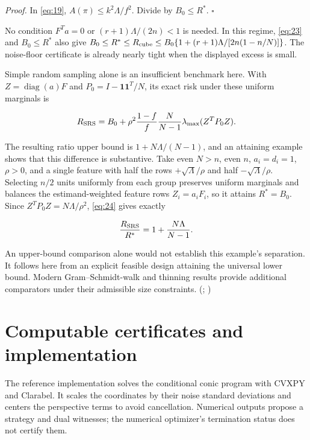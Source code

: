 \documentclass[11pt]{article}
\begin{document}
\emph{Proof.} In \eqref{eq:19}, \(A(\pi)\le k^2\Lambda/f^2\). Divide by
\(B_0\le R^*\). \(\square\)

No condition \(F^Ta=0\) or \((r+1)\Lambda/(2n)<1\) is needed. In this
regime, \eqref{eq:23} and \(B_0\le R^*\) also give
\(B_0\le R^*\le R_{\rm cube}\le B_0\{1+(r+1)\Lambda/[2n(1-n/N)]\}\). The
noise-floor certificate is already nearly tight when the displayed
excess is small.

Simple random sampling alone is an insufficient benchmark here. With
\(Z=\operatorname{diag}(a)F\) and \(P_0=I-\mathbf1\mathbf1^T/N\), its
exact risk under these uniform marginals is

\begin{equation}\label{eq:24}
R_{\rm SRS}=B_0+
\rho^2\frac{1-f}{f}\frac{N}{N-1}
\lambda_{\max}(Z^TP_0Z). 
\end{equation}

The resulting ratio upper bound is \(1+N\Lambda/(N-1)\), and an
attaining example shows that this difference is substantive. Take even
\(N>n\), even \(n\), \(a_i=d_i=1\), \(\rho>0\), and a single feature
with half the rows \(+\sqrt{\Lambda}/\rho\) and half
\(-\sqrt{\Lambda}/\rho\). Selecting \(n/2\) units uniformly from each
group preserves uniform marginals and balances the estimand-weighted
feature rows \(Z_i=a_iF_i\), so it attains \(R^*=B_0\). Since
\(Z^TP_0Z=N\Lambda/\rho^2\), \eqref{eq:24} gives exactly

\begin{equation}\label{eq:24a}
\frac{R_{\rm SRS}}{R^*}=1+\frac{N\Lambda}{N-1}. 
\end{equation}

An upper-bound comparison alone would not establish this example's
separation. It follows here from an explicit feasible design attaining
the universal lower bound. Modern Gram--Schmidt-walk and thinning
results provide additional comparators under their admissible size
constraints. (\citealp[Theorem 4.1]{HarshawEtAl2022};
\citealp{CarrellEtAl2025})

\section{Computable certificates and
implementation}\label{computable-certificates-and-implementation}

The reference implementation solves the conditional conic program with
CVXPY and Clarabel. It scales the coordinates by their noise standard
deviations and centers the perspective terms to avoid cancellation.
Numerical outputs propose a strategy and dual witnesses; the numerical
optimizer's termination status does not certify them.
\end{document}
